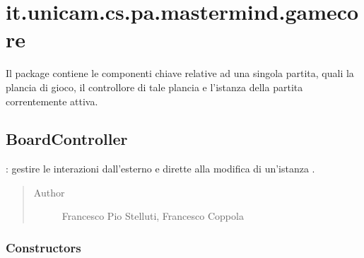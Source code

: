 \documentclass[letterpaper,10pt,italian]{sphinxmanual}
\begin{document}
\section{it.unicam.cs.pa.mastermind.gamecore}
\label{\detokenize{source/it/unicam/cs/pa/mastermind/gamecore/package-index:it-unicam-cs-pa-mastermind-gamecore}}\label{\detokenize{source/it/unicam/cs/pa/mastermind/gamecore/package-index::doc}}
Il package contiene le componenti chiave relative ad una singola partita, quali la plancia di gioco, il controllore di tale plancia e l’istanza della partita correntemente attiva.

\label{\detokenize{source/it/unicam/cs/pa/mastermind/gamecore/package-index:package-it.unicam.cs.pa.mastermind.gamecore}}

\subsection{BoardController}
\label{\detokenize{source/it/unicam/cs/pa/mastermind/gamecore/BoardController:boardcontroller}}\label{\detokenize{source/it/unicam/cs/pa/mastermind/gamecore/BoardController::doc}}

\begin{fulllineitems}
\label{\detokenize{source/it/unicam/cs/pa/mastermind/gamecore/BoardController:it.unicam.cs.pa.mastermind.gamecore.BoardController}}
: gestire le interazioni dall’esterno e dirette alla modifica di un’istanza .
\begin{quote}\begin{description}
\item[{Author}] \leavevmode
Francesco Pio Stelluti, Francesco Coppola

\end{description}\end{quote}

\end{fulllineitems}



\subsubsection{Constructors}
\label{\detokenize{source/it/unicam/cs/pa/mastermind/gamecore/BoardController:constructors}}
\end{document}
